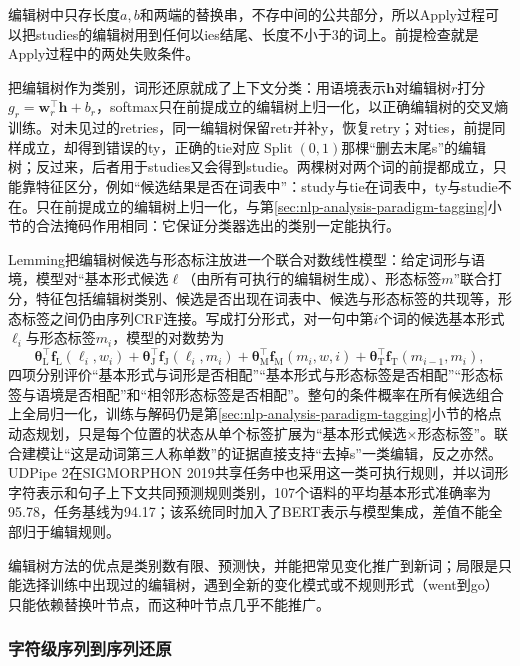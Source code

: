 编辑树中只存长度$a,b$和两端的替换串，不存中间的公共部分，所以Apply过程可以把studies的编辑树用到任何以ies结尾、长度不小于3的词上。前提检查就是Apply过程中的两处失败条件。

把编辑树作为类别，词形还原就成了上下文分类：用语境表示$\bm h$对编辑树$r$打分$g_r=\bm w_r^\top\bm h+b_r$，softmax只在前提成立的编辑树上归一化，以正确编辑树的交叉熵训练。对未见过的retries，同一编辑树保留retr并补y，恢复retry；对ties，前提同样成立，却得到错误的ty，正确的tie对应$\operatorname{Split}(0,1)$那棵“删去末尾s”的编辑树；反过来，后者用于studies又会得到studie。两棵树对两个词的前提都成立，只能靠特征区分，例如“候选结果是否在词表中”：study与tie在词表中，ty与studie不在。只在前提成立的编辑树上归一化，与第\ref{sec:nlp-analysis-paradigm-tagging}小节的合法掩码作用相同：它保证分类器选出的类别一定能执行。

Lemming把编辑树候选与形态标注放进一个联合对数线性模型：给定词形与语境，模型对“基本形式候选$\ell$（由所有可执行的编辑树生成）、形态标签$m$”联合打分，特征包括编辑树类别、候选是否出现在词表中、候选与形态标签的共现等，形态标签之间仍由序列CRF连接。写成打分形式，对一句中第$i$个词的候选基本形式$\ell_i$与形态标签$m_i$，模型的对数势为
\[
  \bm\theta_{\mathrm L}^\top\bm f_{\mathrm L}(\ell_i,w_i)+\bm\theta_{\mathrm J}^\top\bm f_{\mathrm J}(\ell_i,m_i)+\bm\theta_{\mathrm M}^\top\bm f_{\mathrm M}(m_i,w,i)+\bm\theta_{\mathrm T}^\top\bm f_{\mathrm T}(m_{i-1},m_i),
\]
四项分别评价“基本形式与词形是否相配”“基本形式与形态标签是否相配”“形态标签与语境是否相配”和“相邻形态标签是否相配”。整句的条件概率在所有候选组合上全局归一化，训练与解码仍是第\ref{sec:nlp-analysis-paradigm-tagging}小节的格点动态规划，只是每个位置的状态从单个标签扩展为“基本形式候选×形态标签”。联合建模让“这是动词第三人称单数”的证据直接支持“去掉s”一类编辑，反之亦然。UDPipe 2在SIGMORPHON 2019共享任务中也采用这一类可执行规则，并以词形字符表示和句子上下文共同预测规则类别，107个语料的平均基本形式准确率为95.78，任务基线为94.17；该系统同时加入了BERT表示与模型集成，差值不能全部归于编辑规则。

编辑树方法的优点是类别数有限、预测快，并能把常见变化推广到新词；局限是只能选择训练中出现过的编辑树，遇到全新的变化模式或不规则形式（went到go）只能依赖替换叶节点，而这种叶节点几乎不能推广。

\subsubsection{字符级序列到序列还原}
\label{sec:nlp-analysis-seq2seq-lemma}

